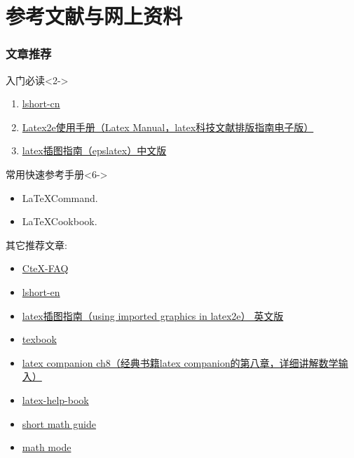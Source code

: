 \section{参考文献与网上资料}
\begin{frame}
    \frametitle{文章推荐}
    \begin{block}{入门必读}<2->
	\begin{enumerate}
	    \item<2-|alert@3> \href{ftp://ftp.ctex.org/pub/tex/CTDP/lshort-cn/}{lshort-cn}
	    \item<2-|alert@4> \href{ftp://ftp.ctex.org/pub/tex/documents/bible/latex_manual.zip}{Latex2e使用手册（Latex Manual，latex科技文献排版指南电子版）}
	    \item<2-|alert@5> \href{ftp://ftp.ctex.org/pub/tex/documents/bible/latex_graphics.zip}{latex插图指南（epslatex）中文版} 
	\end{enumerate}
    \end{block}
	\begin{block}{常用快速参考手册}<6->
		\begin{itemize}
			\item \LaTeX Command.
			\item \LaTeX Cookbook.
		\end{itemize}
	\end{block}
\end{frame}

\begin{frame}[allowframebreaks]
    其它推荐文章: 
    \begin{itemize}
	\item \href{ftp://ftp.ctex.org/pub/tex/CTDP/ctex-faq/}{CteX-FAQ}  
	\item \href{ftp://ftp.ctex.org/mirrors/CTAN/info/lshort/english/}{lshort-en} 
	\item \href{ftp://ftp.ctex.org/mirrors/CTAN/info/epslatex.pdf}{latex插图指南（using imported graphics in latex2e） 英文版} 
	\item \href{ftp://ftp.ctex.org/pub/tex/documents/bible/texbook/}{texbook} 
	\item \href{ftp://ftp.ctex.org/pub/tex/documents/bible/LaTeX_Companion_ch8.zip}{latex companion ch8（经典书籍latex companion的第八章，详细讲解数学输入）}
	\item \href{ftp://ftp.ctex.org/mirrors/CTAN/info/latexhelpbook/}{latex-help-book} 
	\item \href{ftp://ftp.ams.org/pub/tex/doc/amsmath/short-math-guide.pdf}{short math guide} 
	\item \href{www.tug.org/tex-archive/info/math/voss/Voss-Mathmode.pdf}{math mode} 
    \end{itemize}
\end{frame}

